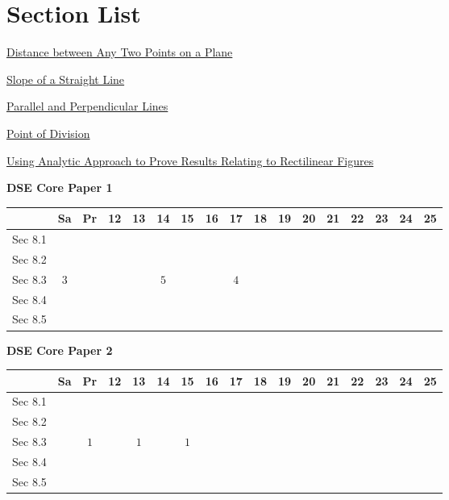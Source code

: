\documentclass[12pt, a4paper]{article}
\begin{document}
\section*{Section List}
\begin{enumx}[label=Sec 8.\arabic*\ ]
\item \hyperref[section:3-8-1]{Distance between Any Two Points on a Plane}
\item \hyperref[section:3-8-2]{Slope of a Straight Line}
\item \hyperref[section:3-8-3]{Parallel and Perpendicular Lines}
\item \hyperref[section:3-8-4]{Point of Division}
\item \hyperref[section:3-8-5]{Using Analytic Approach to Prove Results Relating to Rectilinear Figures \NF}
\end{enumx}
\begin{absolutelynopagebreak}
\begin{center}
\textbf{DSE Core Paper 1}
\end{center}
\begin{center}
\begin{tabular}{|l|c|c|c|c|c|c|c|c|c|c|c|c|c|c|c|c|}
\hline
        & Sa & Pr & 12 & 13 & 14 & 15 & 16 & 17 & 18 & 19 & 20 & 21 & 22 & 23 & 24 & 25 \\\hline\hline
Sec 8.1 &  &  &  &  &  &  &  &  &  &  &  &  &  &  &  &  \\\hline
Sec 8.2 &  &  &  &  &  &  &  &  &  &  &  &  &  &  &  &  \\\hline
Sec 8.3 &  $3$ &  &  &  &  $5$ &  &  &  $4$ &  &  &  &  &  &  &  &  \\\hline
Sec 8.4 &  &  &  &  &  &  &  &  &  &  &  &  &  &  &  &  \\\hline
Sec 8.5 &  &  &  &  &  &  &  &  &  &  &  &  &  &  &  &  \\\hline
\end{tabular}
\end{center}
\end{absolutelynopagebreak}
\begin{absolutelynopagebreak}
\begin{center}
\textbf{DSE Core Paper 2}
\end{center}
\begin{center}
\begin{tabular}{|l|c|c|c|c|c|c|c|c|c|c|c|c|c|c|c|c|}
\hline
        & Sa & Pr & 12 & 13 & 14 & 15 & 16 & 17 & 18 & 19 & 20 & 21 & 22 & 23 & 24 & 25 \\\hline\hline
Sec 8.1 &  &  &  &  &  &  &  &  &  &  &  &  &  &  &  &  \\\hline
Sec 8.2 &  &  &  &  &  &  &  &  &  &  &  &  &  &  &  &  \\\hline
Sec 8.3 &  &  $1$ &  &  $1$ &  &  $1$ &  &  &  &  &  &  &  &  &  &  \\\hline
Sec 8.4 &  &  &  &  &  &  &  &  &  &  &  &  &  &  &  &  \\\hline
Sec 8.5 &  &  &  &  &  &  &  &  &  &  &  &  &  &  &  &  \\\hline
\end{tabular}
\end{center}
\end{absolutelynopagebreak}
\end{document}
